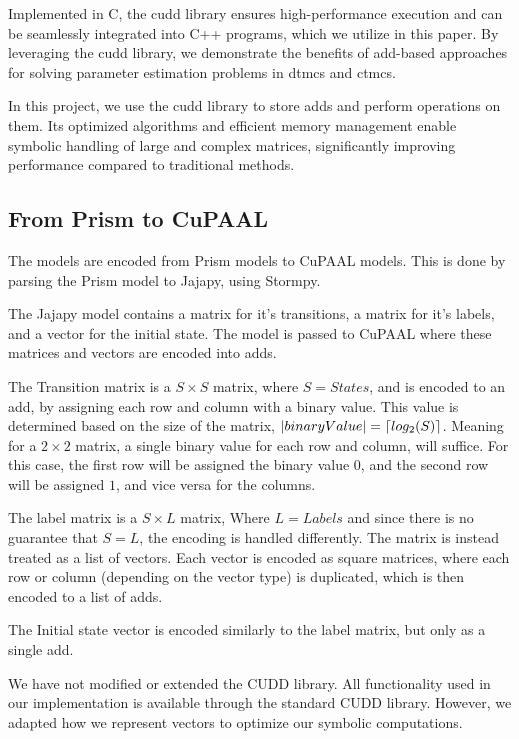 Implemented in C, the \gls{cudd} library ensures high-performance execution and can be seamlessly integrated into C++ programs, which we utilize in this paper.
By leveraging the \gls{cudd} library, we demonstrate the benefits of \gls{add}-based approaches for solving parameter estimation problems in \glspl{dtmc} and \glspl{ctmc}.

In this project, we use the \gls{cudd} library to store \glspl{add} and perform operations on them.
Its optimized algorithms and efficient memory management enable symbolic handling of large and complex matrices, significantly improving performance compared to traditional methods.



\subsection{From Prism to CuPAAL}\label{subsec:from_prism_to_cupaal}
The models are encoded from Prism models to CuPAAL models. This is done by parsing the Prism model to Jajapy, using Stormpy.

The Jajapy model contains a matrix for it's transitions, a matrix for it's labels, and a vector for the initial state. The model is passed to CuPAAL where these matrices and vectors are encoded into \glspl{add}.

The Transition matrix is a $S\times S$ matrix, where $S=States$, and is encoded to an \gls{add}, by assigning each row and column with a binary value. This value is determined based on the size of the matrix,
$|binaryValue| = \left\lceil log_2(S) \right\rceil$.
Meaning for a $2\times 2$ matrix, a single binary value for each row and column, will suffice.
For this case, the first row will be assigned the binary value $0$, and the second row will be assigned $1$, and vice versa for the columns.

The label matrix is a $S\times L$ matrix, Where $L=Labels$ and since there is no guarantee that $S = L$, the encoding is handled differently.
The matrix is instead treated as a list of vectors.
Each vector is encoded as square matrices, where each row or column (depending on the vector type) is duplicated, which is then encoded to a list of \glspl{add}.

The Initial state vector is encoded similarly to the label matrix, but only as a single \gls{add}.

We have not modified or extended the CUDD library.
All functionality used in our implementation is available through the standard CUDD library.
However, we adapted how we represent vectors to optimize our symbolic computations.

